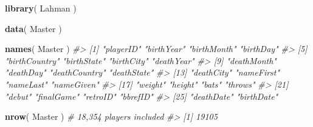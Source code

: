 \documentclass[]{book}
\newenvironment{Shaded}{\begin{snugshade}}{\end{snugshade}}
\newcommand{\CommentTok}[1]{\textcolor[rgb]{0.56,0.35,0.01}{\textit{#1}}}
\newcommand{\KeywordTok}[1]{\textcolor[rgb]{0.13,0.29,0.53}{\textbf{#1}}}
\newcommand{\NormalTok}[1]{#1}
\theoremstyle{definition}
\theoremstyle{definition}
\theoremstyle{definition}
\theoremstyle{remark}
\begin{document}
\begin{Shaded}
\begin{Highlighting}[]

\KeywordTok{library}\NormalTok{( Lahman )}

\KeywordTok{data}\NormalTok{( Master )}

\KeywordTok{names}\NormalTok{( Master )}
\CommentTok{#>  [1] "playerID"     "birthYear"    "birthMonth"   "birthDay"    }
\CommentTok{#>  [5] "birthCountry" "birthState"   "birthCity"    "deathYear"   }
\CommentTok{#>  [9] "deathMonth"   "deathDay"     "deathCountry" "deathState"  }
\CommentTok{#> [13] "deathCity"    "nameFirst"    "nameLast"     "nameGiven"   }
\CommentTok{#> [17] "weight"       "height"       "bats"         "throws"      }
\CommentTok{#> [21] "debut"        "finalGame"    "retroID"      "bbrefID"     }
\CommentTok{#> [25] "deathDate"    "birthDate"}

\KeywordTok{nrow}\NormalTok{( Master )  }\CommentTok{# 18,354 players included}
\CommentTok{#> [1] 19105}


\end{Highlighting}
\end{Shaded}
\end{document}
